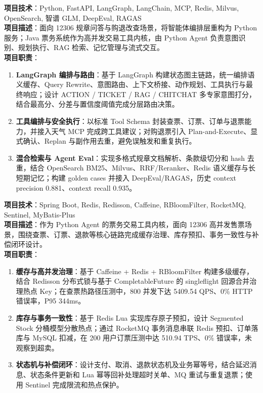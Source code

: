 \documentclass{resume}
\begin{document}
\textbf{项目技术}：Python, FastAPI, LangGraph, LangChain, MCP, Redis, Milvus, OpenSearch, 智谱 GLM, DeepEval, RAGAS\\
\textbf{项目描述}：面向 12306 规章问答与购退改查场景，将智能体编排层重构为 Python 服务；Java 票务系统作为高并发交易工具内核，由 Python Agent 负责意图识别、规划执行、RAG 检索、记忆管理与流式交互。\\
\textbf{项目职责}：
\begin{enumerate}[parsep=0.5ex]
    \item \textbf{LangGraph 编排与路由}：基于 LangGraph 构建状态图主链路，统一编排语义缓存、Query Rewrite、意图路由、上下文桥接、动作规划、工具执行与最终响应；设计 ACTION / TICKET / RAG / CHITCHAT 多专家意图打分，结合最高分、分差与置信度阈值完成分层路由决策。
    \item \textbf{工具编排与安全执行}：以标准 Tool Schema 封装查票、订票、订单与退票能力，并接入天气 MCP 完成跨工具建议；对购退票引入 Plan-and-Execute、显式确认、Replan 与副作用去重，避免误触发和重复执行。
    \item \textbf{混合检索与 Agent Eval}：实现多格式规章文档解析、条款级切分和 hash 去重，结合 OpenSearch BM25、Milvus、RRF/Reranker、Redis 语义缓存与长短期记忆；构建 golden cases 并接入 DeepEval/RAGAS，历史 context precision 0.881、context recall 0.935。
\end{enumerate}

\textbf{项目技术}：Spring Boot, Redis, Redisson, Caffeine, RBloomFilter, RocketMQ, Sentinel, MyBatis-Plus\\
\textbf{项目描述}：作为 Python Agent 的票务交易工具内核，面向 12306 高并发售票场景，围绕查票、订票、退款等核心链路完成缓存治理、库存预扣、事务一致性与补偿闭环设计。\\
\textbf{项目职责}：
\begin{enumerate}[parsep=0.5ex]
    \item \textbf{缓存与高并发治理}：基于 Caffeine + Redis + RBloomFilter 构建多级缓存，结合 Redisson 分布式锁与基于 CompletableFuture 的 singleflight 回源合并治理热点 Key；在查票热路径压测中，800 并发下达 5409.54 QPS、0\% HTTP 错误率，P95 344ms。
    \item \textbf{库存与事务一致性}：基于 Redis Lua 实现库存原子预扣，设计 Segmented Stock 分桶模型分散热点；通过 RocketMQ 事务消息串联 Redis 预扣、订单落库与 MySQL 扣减，在 200 用户订票压测中达 510.94 TPS、0\% 错误率，未观察到超卖。
    \item \textbf{状态机与补偿闭环}：设计支付、取消、退款状态机及业务幂等号，结合延迟消息、状态条件更新和 Lua 幂等回补处理超时关单、MQ 重试与重复退票；使用 Sentinel 完成限流和热点保护。
\end{enumerate}
\end{document}
